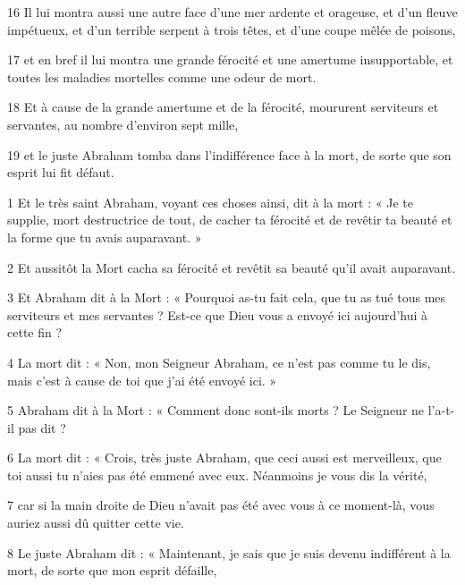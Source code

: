 \par 16 Il lui montra aussi une autre face d'une mer ardente et orageuse, et d'un fleuve impétueux, et d'un terrible serpent à trois têtes, et d'une coupe mêlée de poisons,

\par 17 et en bref il lui montra une grande férocité et une amertume insupportable, et toutes les maladies mortelles comme une odeur de mort.

\par 18 Et à cause de la grande amertume et de la férocité, moururent serviteurs et servantes, au nombre d'environ sept mille,

\par 19 et le juste Abraham tomba dans l'indifférence face à la mort, de sorte que son esprit lui fit défaut.


\par 1 Et le très saint Abraham, voyant ces choses ainsi, dit à la mort : « Je te supplie, mort destructrice de tout, de cacher ta férocité et de revêtir ta beauté et la forme que tu avais auparavant. »

\par 2 Et aussitôt la Mort cacha sa férocité et revêtit sa beauté qu'il avait auparavant.

\par 3 Et Abraham dit à la Mort : « Pourquoi as-tu fait cela, que tu as tué tous mes serviteurs et mes servantes ? Est-ce que Dieu vous a envoyé ici aujourd’hui à cette fin ?

\par 4 La mort dit : « Non, mon Seigneur Abraham, ce n'est pas comme tu le dis, mais c'est à cause de toi que j'ai été envoyé ici. »

\par 5 Abraham dit à la Mort : « Comment donc sont-ils morts ? Le Seigneur ne l’a-t-il pas dit ?

\par 6 La mort dit : « Crois, très juste Abraham, que ceci aussi est merveilleux, que toi aussi tu n'aies pas été emmené avec eux. Néanmoins je vous dis la vérité,

\par 7 car si la main droite de Dieu n'avait pas été avec vous à ce moment-là, vous auriez aussi dû quitter cette vie.

\par 8 Le juste Abraham dit : « Maintenant, je sais que je suis devenu indifférent à la mort, de sorte que mon esprit défaille,

